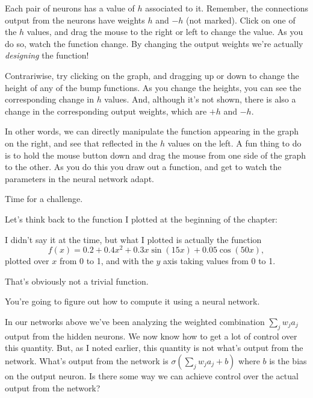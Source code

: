 \documentclass[a4paper,twoside,10pt]{book}
\begin{document}
Each pair of neurons has a value of $h$ associated to it. Remember, the connections output from the neurons have weights $h$ and $-h$ (not marked). Click on one of the $h$ values, and drag the mouse to the right or left to change the value. As you do so, watch the function change. By changing the output weights we're actually \textit{designing} the function!

Contrariwise, try clicking on the graph, and dragging up or down to change the height of any of the bump functions. As you change the heights, you can see the corresponding change in $h$ values. And, although it's not shown, there is also a change in the corresponding output weights, which are $+h$ and $-h$.

In other words, we can directly manipulate the function appearing in the graph on the right, and see that reflected in the $h$ values on the left. A fun thing to do is to hold the mouse button down and drag the mouse from one side of the graph to the other. As you do this you draw out a function, and get to watch the parameters in the neural network adapt.

Time for a challenge.

Let's think back to the function I plotted at the beginning of the chapter:
\begin{center} 
\end{center}
I didn't say it at the time, but what I plotted is actually the function
\begin{equation}
f(x)=0.2+0.4x^2+0.3x\sin(15x)+0.05\cos(50x),\label{eq:113}
\end{equation}
plotted over $x$ from 0 to 1, and with the $y$ axis taking values from 0 to 1.

That's obviously not a trivial function.

You're going to figure out how to compute it using a neural network.

In our networks above we've been analyzing the weighted combination $\sum_jw_ja_j$ output from the hidden neurons. We now know how to get a lot of control over this quantity. But, as I noted earlier, this quantity is not what's output from the network. What's output from the network is $\sigma(\sum_jw_ja_j+b)$ where $b$ is the bias on the output neuron. Is there some way we can achieve control over the actual output from the network?
\end{document}
